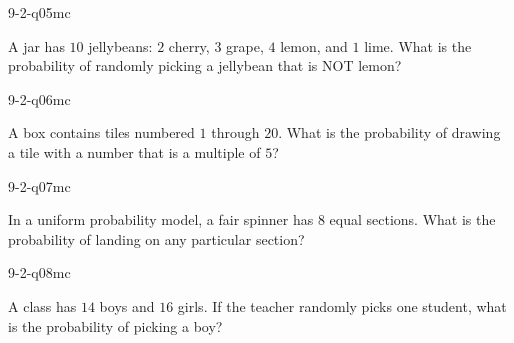 \begin{practiceQuestion}{9-2-q05}{mc}
\begin{questionText}
A jar has $10$ jellybeans: $2$ cherry, $3$ grape, $4$ lemon, and $1$ lime. What is the probability of randomly picking a jellybean that is NOT lemon?
\end{questionText}
\end{practiceQuestion}

\begin{practiceQuestion}{9-2-q06}{mc}
\begin{questionText}
A box contains tiles numbered $1$ through $20$. What is the probability of drawing a tile with a number that is a multiple of $5$?
\end{questionText}
\end{practiceQuestion}

\begin{practiceQuestion}{9-2-q07}{mc}
\begin{questionText}
In a uniform probability model, a fair spinner has $8$ equal sections. What is the probability of landing on any particular section?
\end{questionText}
\end{practiceQuestion}

\begin{practiceQuestion}{9-2-q08}{mc}
\begin{questionText}
A class has $14$ boys and $16$ girls. If the teacher randomly picks one student, what is the probability of picking a boy?
\end{questionText}
\end{practiceQuestion}

